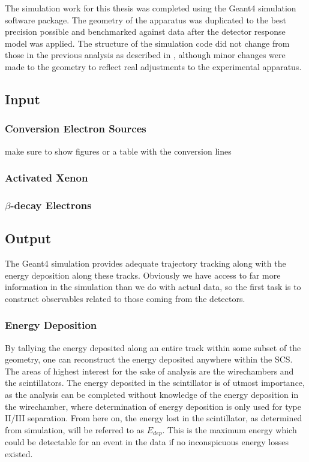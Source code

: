 The simulation work for this thesis was completed
using the Geant4 simulation software package. The geometry of the
apparatus was duplicated
to the best precision possible and benchmarked against data after
the detector response model was applied. The structure
of the simulation code did not change from those in the previous analysis
as described in \cite{mpmThesis}, although minor changes were
made to the geometry to reflect real adjustments to the experimental
apparatus. 

\subsection{Input}
\subsubsection{Conversion Electron Sources}
make sure to show figures or a table with the conversion lines
\subsubsection{Activated Xenon}
\subsubsection{$\beta$-decay Electrons} \label{sssec:betaSim}

\subsection{Output}
The Geant4 simulation provides adequate trajectory tracking along with
the energy deposition along these tracks. Obviously we have access to far
more information in the simulation than we do with actual data, so the first
task is to construct observables related to those coming from the detectors.

\subsubsection{Energy Deposition}
By tallying the energy deposited along an entire track within some subset
of the geometry, one can reconstruct the energy deposited anywhere within
the SCS. The areas of highest interest for the sake of analysis are the
wirechambers and the scintillators. The energy deposited in the scintillator
is of utmost importance, as the analysis can be completed without knowledge
of the energy deposition in the wirechamber, where determination of energy
deposition is only used for type II/III separation. From here on,
the energy lost in the scintillator, as determined from simulation, will be
referred to as $E_{dep}$. This is the maximum energy which could be detectable
for an event in the data if no inconspicuous energy losses existed.

